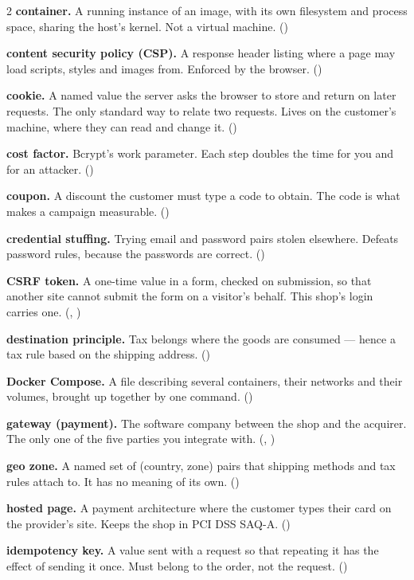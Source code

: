 \begin{multicols}{2}
\textbf{container.} A running instance of an image, with its own filesystem and
process space, sharing the host's kernel. Not a virtual machine.
()

\textbf{content security policy (CSP).} A response header listing where a page
may load scripts, styles and images from. Enforced by the browser.
()

\textbf{cookie.} A named value the server asks the browser to store and return
on later requests. The only standard way to relate two requests. Lives on the
customer's machine, where they can read and change it. ()

\textbf{cost factor.} Bcrypt's work parameter. Each step doubles the time for
you and for an attacker. ()

\textbf{coupon.} A discount the customer must type a code to obtain. The code
is what makes a campaign measurable. ()

\textbf{credential stuffing.} Trying email and password pairs stolen elsewhere.
Defeats password rules, because the passwords are correct. ()

\textbf{CSRF token.} A one-time value in a form, checked on submission, so that
another site cannot submit the form on a visitor's behalf. This shop's login
carries one. (, )

\textbf{destination principle.} Tax belongs where the goods are consumed ---
hence a tax rule based on the shipping address. ()

\textbf{Docker Compose.} A file describing several containers, their networks
and their volumes, brought up together by one command. ()

\textbf{gateway (payment).} The software company between the shop and the
acquirer. The only one of the five parties you integrate with.
(, )

\textbf{geo zone.} A named set of (country, zone) pairs that shipping methods
and tax rules attach to. It has no meaning of its own. ()

\textbf{hosted page.} A payment architecture where the customer types their
card on the provider's site. Keeps the shop in PCI DSS SAQ-A.
()

\textbf{idempotency key.} A value sent with a request so that repeating it has
the effect of sending it once. Must belong to the order, not the request.
()


\end{multicols}
